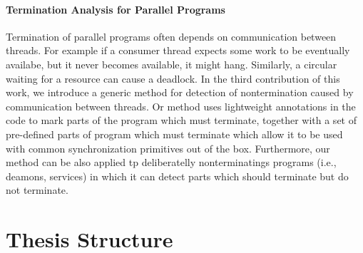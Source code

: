 \paragraph{Termination Analysis for Parallel Programs}

Termination of parallel programs often depends on communication between threads.
For example if a consumer thread expects some work to be eventually availabe, but it never becomes available, it might hang.
Similarly, a circular waiting for a resource can cause a deadlock.
In the third contribution of this work, we introduce a generic method for detection of nontermination caused by communication between threads.
Or method uses lightweight annotations in the code to mark parts of the program which must terminate, together with a set of pre-defined parts of program which must terminate which allow it to be used with common synchronization primitives out of the box.
Furthermore, our method can be also applied tp deliberatelly nonterminatings programs (i.e., deamons, services) in which it can detect parts which should terminate but do not terminate.

\section{Thesis Structure}
